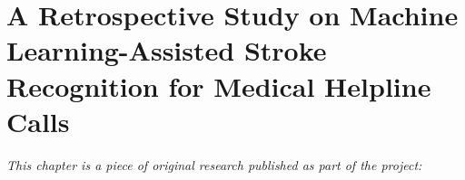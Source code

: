 
\chapter[a retrospective study on machine learning-assisted stroke recognition for medical helpline calls]{A Retrospective Study on Machine Learning-Assisted Stroke Recognition for Medical Helpline Calls}
\label{chp:paper-retrospective}

\textit{This chapter is a piece of original research published as part of the project:} \newline
\begin{center}
    \begin{enumerate}[leftmargin=8mm,rightmargin=8mm,topsep=0mm,label={[\Alph*]}]
        \setcounter{enumi}{5}
        \item {} \shared \hspace{0.1em} \parencite{wenstrup_retrospective_2023}
    \end{enumerate}
\end{center}

